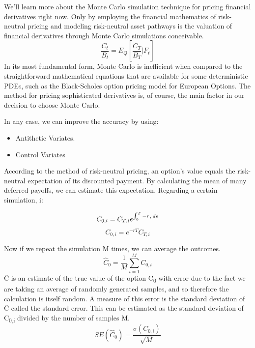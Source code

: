 \noindent We'll learn more about the Monte Carlo simulation technique for pricing financial derivatives right now. Only by employing the financial mathematics of risk-neutral pricing and modeling risk-neutral asset pathways is the valuation of financial derivatives through Monte Carlo simulations conceivable.\\
\begin{equation}
	\frac{C_{t}}{B_{t}}= E_{Q}[\frac{C_{T}}{B_{T}}|F_{t}]
\end{equation}
\noindent In its most fundamental form, Monte Carlo is inefficient when compared to the straightforward mathematical equations that are available for some deterministic PDEs, such as the Black-Scholes option pricing model for European Options. The method for pricing sophisticated derivatives is, of course, the main factor in our decision to choose Monte Carlo.

In any case, we can improve the accuracy by using:
\begin{itemize}
	\item Antithetic Variates.\\[-2mm]
	\item Control Variates
\end{itemize}
\noindent According to the method of risk-neutral pricing, an option's value equals the risk-neutral expectation of its discounted payment.
By calculating the mean of many deferred payoffs, we can estimate this expectation. Regarding a certain simulation, i:

\begin{equation}
	C_{0,i}= C_{T,i}e^{\int_{0}^{T}-r_{s}\,ds}\\
\end{equation}
\begin{equation}
	C_{0,i}=e^{-rT}C_{T,i}
\end{equation}

\noindent Now if we repeat the simulation M times, we can average the outcomes.\\
\begin{equation}
	\hat{C}_{0}=\frac{1}{M} \sum_{i=1}^{M} C_{0,i}
\end{equation}
\noindent \^{C} is an estimate of the true value of the option 
C\textsubscript{0} with error due to the fact we are taking an average of randomly generated samples, and so therefore the calculation is itself random. A measure of this error is the standard deviation of 
\^{C} called the standard error. This can be estimated as the standard deviation of C\textsubscript{0,i} divided by the number of samples M.
$$SE(\hat{C}_{0})=\frac{\sigma(C_{0,i})}{\sqrt{M}}$$ 

